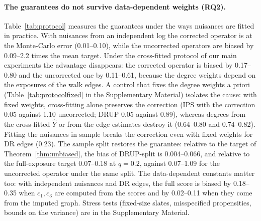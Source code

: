 \paragraph{The guarantees do not survive data-dependent weights (RQ2).}
Table~\ref{tab:protocol} measures the guarantees under the ways nuisances are
fitted in practice. With nuisances from an independent log the corrected operator is
at the Monte-Carlo error (0.01--0.10), while the uncorrected operators are biased by
0.09--2.2 times the mean target. Under the cross-fitted protocol of our main
experiments the advantage disappears: the corrected operator is biased by
0.17--0.80 and the uncorrected one by 0.11--0.61, because the degree weights
depend on the exposures of the walk edges. A control that fixes the degree weights
a priori (Table~\ref{tab:protocolfixed} in the Supplementary Material) isolates the
cause: with fixed weights, cross-fitting alone preserves the correction (IPS with the
correction 0.05 against 1.10 uncorrected; DRUP 0.05 against 0.89), whereas degrees
from the cross-fitted $\hat Y$ or from the edge estimates destroy it (0.64--0.80 and
0.74--0.82). Fitting the nuisances in sample breaks the correction even with fixed
weights for DR edges (0.23). The sample split restores the guarantee: relative to
the target of Theorem~\ref{thm:unbiased}, the bias of DRUP-split is 0.004--0.066, and
relative to the full-exposure target 0.07--0.18 at $q=0.2$, against 0.07--1.09 for
the uncorrected operator under the same split. The data-dependent constants matter
too: with independent nuisances and DR edges, the full score is biased by 0.18--0.35
when $c_1,c_3$ are computed from the scores and by 0.02--0.11 when they come from the
imputed graph. Stress tests (fixed-size slates, misspecified propensities, bounds on
the variance) are in the Supplementary Material.
